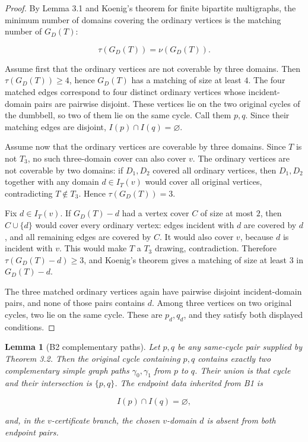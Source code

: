 \documentclass[11pt]{amsart}
\newtheorem{lemma}[theorem]{Lemma}
\theoremstyle{definition}
\begin{document}
\begin{proof}
By Lemma 3.1 and Koenig's theorem for finite bipartite multigraphs,
the minimum number of domains covering the ordinary vertices is the matching
number of \(G_D(T)\):

\[
\tau(G_D(T))=\nu(G_D(T)).
\]

Assume first that the ordinary vertices are not coverable by three domains. Then \(\tau(G_D(T))\ge 4\), hence \(G_D(T)\) has a matching of size at least \(4\). The four matched edges correspond to four distinct ordinary vertices whose incident-domain pairs are pairwise disjoint. These vertices lie on the two original cycles of the dumbbell, so two of them lie on the same cycle. Call them \(p,q\). Since their matching edges are disjoint, \(I(p)\cap I(q)=\varnothing\).

Assume now that the ordinary vertices are coverable by three domains. Since \(T\)
is not \(T_3\), no such three-domain cover can also cover \(v\). The ordinary
vertices are not coverable by two domains: if \(D_1,D_2\) covered all ordinary
vertices, then \(D_1,D_2\) together with any domain \(d\in I_T(v)\) would cover all
original vertices, contradicting \(T\notin T_3\). Hence \(\tau(G_D(T))=3\).

Fix \(d\in I_T(v)\). If \(G_D(T)-d\) had a vertex cover \(C\) of size at most \(2\),
then \(C\cup\{d\}\) would cover every ordinary vertex: edges incident with \(d\) are
covered by \(d\), and all remaining edges are covered by \(C\). It would also cover
\(v\), because \(d\) is incident with \(v\). This would make \(T\) a \(T_3\) drawing,
contradiction. Therefore \(\tau(G_D(T)-d)\ge 3\), and Koenig's theorem gives a
matching of size at least \(3\) in \(G_D(T)-d\).

The three matched ordinary vertices again have pairwise disjoint incident-domain pairs, and none of those pairs contains \(d\). Among three vertices on two original cycles, two lie on the same cycle. These are \(p_d,q_d\), and they satisfy both displayed conditions.

\end{proof}
\begin{lemma}[B2 complementary paths]
Let \(p,q\) be any same-cycle pair supplied by Theorem 3.2. Then the original cycle containing \(p,q\) contains exactly two complementary simple graph paths \(\gamma_0,\gamma_1\) from \(p\) to \(q\). Their union is that cycle and their intersection is \(\{p,q\}\). The endpoint data inherited from B1 is

\[
I(p)\cap I(q)=\varnothing,
\]

and, in the \(v\)-certificate branch, the chosen \(v\)-domain \(d\) is absent from both endpoint pairs.

\end{lemma}
\end{document}
